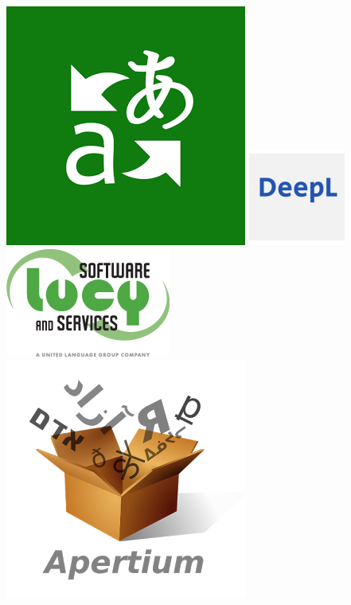 \documentclass{beamer}
\begin{document}
\begin{frame}
\begin{itemize}
\includegraphics[scale=0.1]{bing.png}
\includegraphics[scale=0.25]{deepl.png}
\includegraphics[scale=0.2]{lucy.png}
\includegraphics[scale=0.11]{apertium.png}
\pause
\end{itemize}
\end{frame}
\end{document}
